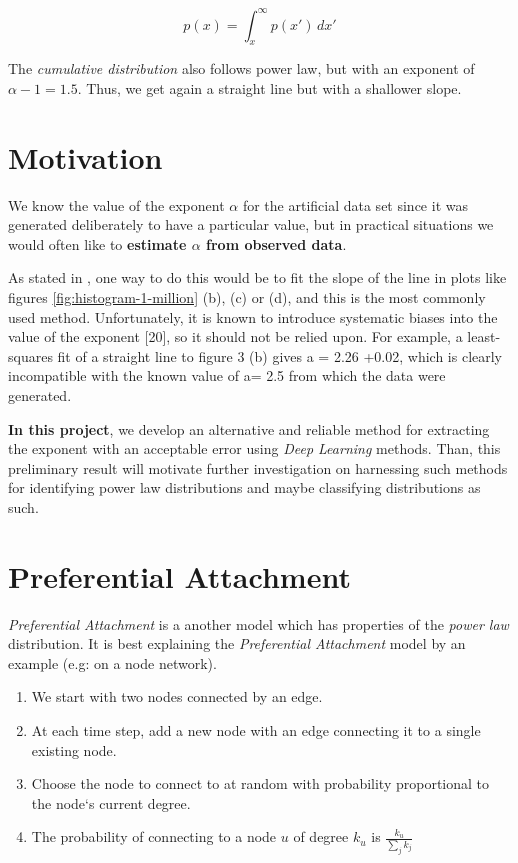 \documentclass[a4paper, 12pt]{report}
\begin{document}
\begin{equation}
\label{eq:cumsum}
p(x) = \int_{x}^{\infty} p(x')\, dx'
\end{equation}

The \textit{cumulative distribution} also follows power law, but with an exponent of $\alpha-1 = 1.5$. Thus, we get again a straight line but with a shallower slope.

\section{Motivation}
We know the value of the exponent $\alpha$ for the artificial data set since it was generated deliberately to have a particular value, but in practical situations we would often like to \textbf{estimate $\alpha$ from observed data}.

As stated in \cite{newman}, one way to do this would be to fit the slope of the line in plots like figures \ref{fig:histogram-1-million} (b), (c) or (d), and this is the most commonly used method.
Unfortunately, it is known to introduce systematic biases into the value of the exponent [20], so it should not be relied upon. For example, a least-squares fit of a straight line to
figure 3 (b) gives a = 2.26 +0.02, which is clearly incompatible with the known value of a= 2.5 from which the data were generated.

\textbf{In this project}, we develop an alternative and reliable method for extracting the exponent with an acceptable error using \textit{Deep Learning} methods. Than, this preliminary result will motivate further investigation on harnessing such methods for identifying power law distributions and maybe classifying distributions as such.

\pagebreak
\section{Preferential Attachment}
\textit{Preferential Attachment} is a another model which has properties of the \textit{power law} distribution. It is best explaining the \textit{Preferential Attachment} model by an example (e.g: on a node network).
\begin{enumerate}
\small
    \item We start with two nodes connected by an edge.
    \item At each time step, add a new node with an edge connecting it to a single existing node. 
    \item Choose the node to connect to at random with probability proportional to the node`s current degree.
    \item The probability of connecting to a node $u$ of degree $k_u$ is $\frac{k_u}{\sum_j{k_j}}$
\end{enumerate}
\end{document}
